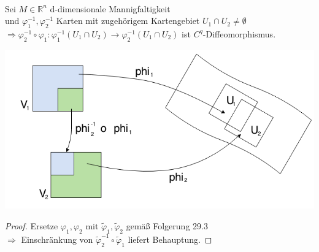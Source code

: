 \begin{lemma}[Kartenwechsel] 
\mbox{} \\
Sei $M \in \mathbb{R}^n $ d-dimensionale Mannigfaltigkeit \\
und $\varphi_1^{-1}, \varphi_2^{-1} $ Karten mit zugehörigem Kartengebiet 
$U_1 \cap U_2 \neq \emptyset $ \\
$\Longrightarrow 
\varphi_2^{-1} \circ \varphi_1 : \varphi_1^{-1} \left( U_1 \cap U_2 \right)
\rightarrow \varphi_2^{-1} \left( U_1 \cap U_2 \right) $ ist $C^q$-Diffeomorphismus.\\
\begin{center}
\includegraphics[scale=0.5]{pictures/MA2_0012}\\
\end{center}
\end{lemma}

\begin{proof}
Ersetze $\varphi_1, \varphi_2 $ mit $\tilde{\varphi}_1, \tilde{\varphi}_2 $
gemäß Folgerung 29.3 \\
$\Rightarrow$ Einschränkung von $\tilde{\varphi}_2^{-1} \circ \tilde{\varphi}_1 $
liefert Behauptung. 
\end{proof}

